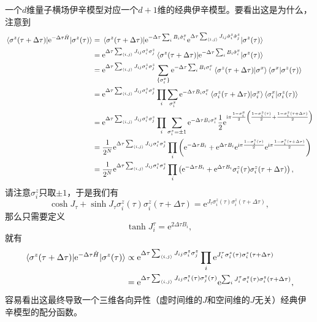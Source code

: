 \documentclass[hyperref, UTF8, a4paper]{ctexart}
\newcommand*{\ii}{\mathrm{i}}
\newcommand*{\ee}{\mathrm{e}}
\newcommand*{\pair}[1]{\langle #1 \rangle}
\begin{document}
一个$d$维量子横场伊辛模型对应一个$d+1$维的经典伊辛模型。要看出这是为什么，注意到
\[
    \begin{aligned}
        \mel{\sigma^z(\tau + \Delta \tau)}{\ee^{-\Delta \tau \hat{H}}}{\sigma^z(\tau)} &= \mel{\sigma^z(\tau + \Delta \tau)}{\ee^{-\Delta \tau \sum_i B_i \hat{\sigma}^x_i} \ee^{\Delta \tau \sum_{\pair{i, j}} J_{ij} \hat{\sigma}_i^z \hat{\sigma}_j^z}}{\sigma^z(\tau)} \\
        &= \ee^{\Delta \tau \sum_{\pair{i, j}} J_{ij} \sigma_i^z \sigma_j^z} \mel{\sigma^z(\tau + \Delta \tau)}{\ee^{-\Delta \tau \sum_i B_i \hat{\sigma}^x_i}}{\sigma^z(\tau)} \\
        &= \ee^{\Delta \tau \sum_{\pair{i, j}} J_{ij} \sigma_i^z \sigma_j^z} \sum_{\{\sigma^x_i\}} \ee^{-\Delta \tau \sum_i B_i \sigma^x_i} \braket{\sigma^z(\tau + \Delta \tau)}{\sigma^x} \braket{\sigma^x}{\sigma^z(\tau)} \\
        &= \ee^{\Delta \tau \sum_{\pair{i, j}} J_{ij} \sigma_i^z \sigma_j^z} \prod_{i} \sum_{\sigma^x_i} \ee^{-\Delta \tau B_i \sigma^x_i} \braket{\sigma^z_i(\tau + \Delta \tau)}{\sigma^x_i} \braket{\sigma^x_i}{\sigma^z_i(\tau)} \\
        &= \ee^{\Delta \tau \sum_{\pair{i, j}} J_{ij} \sigma_i^z \sigma_j^z} \prod_{i} \sum_{\sigma^x_i = \pm 1} \ee^{-\Delta \tau B_i \sigma^x_i} \frac{1}{2} \ee^{\ii \pi \frac{1 - \sigma^x_i}{2} \left( \frac{1 - \sigma^z_i(\tau)}{2} + \frac{1 - \sigma^z_i(\tau + \Delta \tau)}{2} \right)} \\
        &= \frac{1}{2^N} \ee^{\Delta \tau \sum_{\pair{i, j}} J_{ij} \sigma_i^z \sigma_j^z} \prod_i \left( \ee^{- \Delta \tau B_i} + \ee^{\Delta \tau B_i} \ee^{\ii \pi \frac{1 - \sigma^z_i(\tau)}{2}} \ee^{\ii \pi \frac{1 - \sigma^z_i(\tau + \Delta \tau)}{2}} \right) \\
        &= \frac{1}{2^N} \ee^{\Delta \tau \sum_{\pair{i, j}} J_{ij} \sigma_i^z \sigma_j^z} \prod_i \left( \ee^{- \Delta \tau B_i} + \ee^{\Delta \tau B_i} \sigma^z_i(\tau) \sigma^z_i(\tau + \Delta \tau) \right),
    \end{aligned}
\]
请注意$\sigma_i^z$只取$\pm 1$，于是我们有
\[
    \cosh J_\tau + \sinh J_\tau \sigma^z_i(\tau) \sigma^z_i(\tau + \Delta \tau) = \ee^{J_\tau \sigma^z_i(\tau) \sigma^z_i(\tau + \Delta \tau)},
\]
那么只需要定义
\begin{equation}
    \tanh J^\tau_i = \ee^{2 \Delta \tau B_i}, 
\end{equation}
就有
\[
    \begin{aligned}
        \mel{\sigma^z(\tau + \Delta \tau)}{\ee^{-\Delta \tau \hat{H}}}{\sigma^z(\tau)} &\propto \ee^{\Delta \tau \sum_{\pair{i, j}} J_{ij} \sigma_i^z \sigma_j^z} \prod_i \ee^{J_i^\tau \sigma_i^z(\tau) \sigma_i^z(\tau + \Delta \tau)} \\
        &= \ee^{\Delta \tau \sum_{\pair{i, j}} J_{ij} \sigma_i^z(\tau) \sigma_j^z(\tau)} \ee^{\sum_i J_i^\tau \sigma_i^z(\tau) \sigma_i^z(\tau + \Delta \tau)},
    \end{aligned}
\]
容易看出这最终导致一个三维各向异性（虚时间维的$J$和空间维的$J$无关）经典伊辛模型的配分函数。
\end{document}
